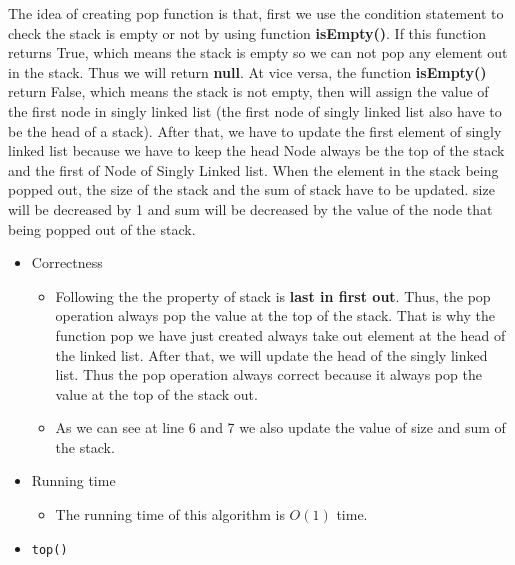 \documentclass{article}
\begin{document}

	The idea of creating pop function is that, first we use the condition statement to check the stack is empty or not by using function \textbf{isEmpty()}. If this function returns True, which means the stack is empty so we can not pop any element out in the stack. Thus we will return \textbf{null}. At vice versa, the function \textbf{isEmpty()} return False, which means the stack is not empty, then will assign the value of the first node in singly linked list (the first node of singly linked list also have to be the head of a stack). After that, we have to update the first element of singly linked list because we have to keep the head Node always be the top of the stack and the first of Node of Singly Linked list. When the element in the stack being popped out, the size of the stack and the sum of stack have to be updated. size will be decreased by 1 and sum will be decreased by the value of the node that being popped out of the stack.


	\begin{itemize}
		\item Correctness
		\begin{itemize}
			\item Following the the property of stack is \textbf{last in first out}. Thus, the pop operation always pop the value at the top of the stack. That is why the function pop we have just created always take out element at the head of the linked list. After that, we will update the head of the singly linked list. Thus the pop operation always correct because it always pop the value at the top of the stack out.
			\item As we can see at line 6 and 7 we also update the value of size and sum of the stack.
		\end{itemize}
		\item Running time
		\begin{itemize}
			\item The running time of this algorithm is \(O(1)\) time.
		\end{itemize}
	\end{itemize}
	\begin{itemize}
		\item \verb|top()|
	\end{itemize}
\end{document}
